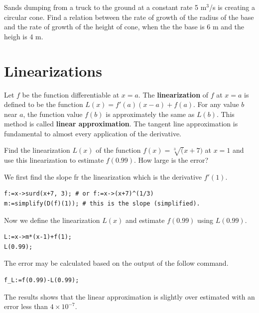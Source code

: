 \documentclass[en,11pt,simple]{elegantbook}
\let\BeginKnitrBlock\begin \let\EndKnitrBlock\end
\begin{document}
\BeginKnitrBlock{exercise}{}{}
\protect\hypertarget{exr:unnamed-chunk-79}{}{\label{exr:unnamed-chunk-79} }
Sands dumping from a truck to the ground at a constant rate 5 m\(^3\)/s is creating a circular cone. Find a relation between the rate of growth of the radius of the base and the rate of growth of the height of cone, when the the base is 6 m and the heigh is 4 m.
\EndKnitrBlock{exercise}

\hypertarget{linearizations}{%
\section{Linearizations}\label{linearizations}}

Let \(f\) be the function differentiable at \(x = a\). The \textbf{linearization} of \(f\) at \(x = a\) is defined to be the function \(L(x)=f'(a)(x-a)+f(a)\). For any value \(b\) near \(a\), the function value \(f(b)\) is approximately the same as \(L(b)\). This method is called \textbf{linear approximation}. The tangent line approximation is fundamental to almost every application of the derivative.

\BeginKnitrBlock{example}{}{}
\protect\hypertarget{exm:unnamed-chunk-80}{}{\label{exm:unnamed-chunk-80} }
Find the linearization \(L(x)\) of the function \(f(x) = \sqrt[3](x+7)\) at \(x=1\) and use this linearization to estimate \(f(0.99)\). How large is the error?
\EndKnitrBlock{example}

\BeginKnitrBlock{solution}{}{}
{}
We first find the slope fr the linearization which is the derivative \(f'(1)\).

\begin{verbatim}
f:=x->surd(x+7, 3); # or f:=x->(x+7)^(1/3)
m:=simplify(D(f)(1)); # this is the slope (simplified).
\end{verbatim}

Now we define the linearization \(L(x)\) and estimate \(f(0.99)\) using \(L(0.99)\).

\begin{verbatim}
L:=x->m*(x-1)+f(1);
L(0.99);
\end{verbatim}

The error may be calculated based on the output of the follow command.

\begin{verbatim}
f_L:=f(0.99)-L(0.99);
\end{verbatim}

The results shows that the linear approximation is slightly over estimated with an error less than \(4\times 10^{-7}\).
\EndKnitrBlock{solution}
\end{document}
